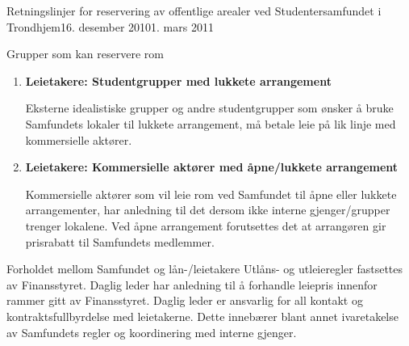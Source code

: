 \begin{instruks}{Retningslinjer for reservering av offentlige arealer
    ved Studentersamfundet i Trondhjem}{16. desember 2010}{1. mars 2011}
\begin{instruksledd}{Grupper som kan reservere rom}
\begin{enumerate}
                Eksterne idealistiske studentgrupper som ønsker å legge sine arrangementer
                til Samfundet
                slipper å betale for romreservasjon under forutsetning av at
                arrangementene er åpne for alle
                Samfundets medlemmer og at arrangør ikke har økonomisk inntjening på
                arrangementet.
                Med ”eksterne idealistiske grupper” forstås i denne instruksen
                studenter/grupper av studenter
                som ikke er tilknyttet gjengene på Samfundet, og som ønsker å legge
                arrangementer av
                kulturell, politisk eller faglig art til Samfundet. Låntakeren skal
                fortrinnsvis være medlem av
                Samfundet, arrangementene skal være åpne for alle våre medlemmer og
                medlemmer skal ha
                rabatt ved eventuell inngangsbillett. Linjeforeningsfester og andre
                lukkede arrangement faller
                inn under utleie (se punkt 3.3 og 3.4).

            \item \textbf{Leietakere: Studentgrupper med lukkete arrangement}

                Eksterne idealistiske grupper og andre studentgrupper som ønsker å bruke
                Samfundets lokaler
                til lukkete arrangement, må betale leie på lik linje med kommersielle
                aktører.

            \item \textbf{ Leietakere: Kommersielle aktører med åpne/lukkete arrangement}

                Kommersielle aktører som vil leie rom ved Samfundet til åpne eller lukkete
                arrangementer,
                har anledning til det dersom ikke interne gjenger/grupper trenger
                lokalene. Ved åpne
                arrangement forutsettes det at arrangøren gir prisrabatt til Samfundets
                medlemmer.
        \end{enumerate}
    \end{instruksledd}

    \begin{instruksledd}{Forholdet mellom Samfundet og lån-/leietakere}
        Utlåns- og utleieregler fastsettes av Finansstyret. Daglig leder har anledning
        til å forhandle
        leiepris innenfor rammer gitt av Finansstyret.
        Daglig leder er ansvarlig for all kontakt og kontraktsfullbyrdelse med
        leietakerne. Dette innebærer blant annet
        ivaretakelse av Samfundets regler og koordinering med interne gjenger.


\end{instruksledd}
\end{instruks}

